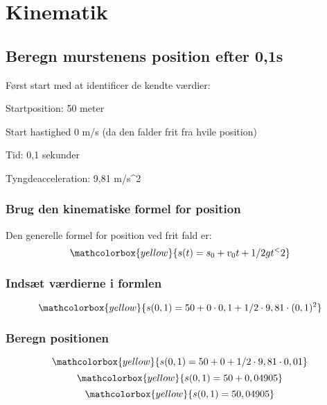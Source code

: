 \section{Kinematik}
\subsection{Beregn murstenens position efter 0,1s}
Først start med at identificer de kendte værdier:
\item Startposition: 50 meter
\item Start hastighed 0 m/s (da den falder frit fra hvile position)
\item Tid: 0,1 sekunder
\item Tyngdeacceleration: 9,81 m/s^2 

\subsubsection{Brug den kinematiske formel for position}
Den generelle formel for position ved frit fald er:
\begin{equation*}
    \mathcolorbox{yellow}{s(t)=s_0+v_0t+1/2gt^<{2}}
\end{equation*}

\subsubsection{Indsæt værdierne i formlen}
\begin{equation*}
    \mathcolorbox{yellow}{s(0,1)=50+0\cdot0,1+1/2\cdot9,81\cdot(0,1)^{2}}
\end{equation*}

\subsubsection{Beregn positionen}
\begin{equation*}
    \mathcolorbox{yellow}{s(0,1)=50+0+1/2\cdot9,81\cdot0,01}
\end{equation*}
\begin{equation*}
    \mathcolorbox{yellow}{s(0,1)=50+0,04905}
\end{equation*}
\begin{equation*}
    \mathcolorbox{yellow}{s(0,1)=50,04905}
\end{equation*}